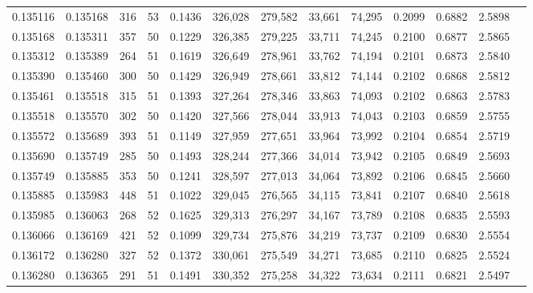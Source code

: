\begin{tabular}{rrrrrrrrrrrrr}
0.135116 & 0.135168 &   316 &  53 &                                     0.1436 & 326,028 & 279,582 &  33,661 &  74,295 & 0.2099 & 0.6882 & 2.5898 \\
0.135168 & 0.135311 &   357 &  50 &                                     0.1229 & 326,385 & 279,225 &  33,711 &  74,245 & 0.2100 & 0.6877 & 2.5865 \\
0.135312 & 0.135389 &   264 &  51 &                                     0.1619 & 326,649 & 278,961 &  33,762 &  74,194 & 0.2101 & 0.6873 & 2.5840 \\
0.135390 & 0.135460 &   300 &  50 &                                     0.1429 & 326,949 & 278,661 &  33,812 &  74,144 & 0.2102 & 0.6868 & 2.5812 \\
0.135461 & 0.135518 &   315 &  51 &                                     0.1393 & 327,264 & 278,346 &  33,863 &  74,093 & 0.2102 & 0.6863 & 2.5783 \\
0.135518 & 0.135570 &   302 &  50 &                                     0.1420 & 327,566 & 278,044 &  33,913 &  74,043 & 0.2103 & 0.6859 & 2.5755 \\
0.135572 & 0.135689 &   393 &  51 &                                     0.1149 & 327,959 & 277,651 &  33,964 &  73,992 & 0.2104 & 0.6854 & 2.5719 \\
0.135690 & 0.135749 &   285 &  50 &                                     0.1493 & 328,244 & 277,366 &  34,014 &  73,942 & 0.2105 & 0.6849 & 2.5693 \\
0.135749 & 0.135885 &   353 &  50 &                                     0.1241 & 328,597 & 277,013 &  34,064 &  73,892 & 0.2106 & 0.6845 & 2.5660 \\
0.135885 & 0.135983 &   448 &  51 &                                     0.1022 & 329,045 & 276,565 &  34,115 &  73,841 & 0.2107 & 0.6840 & 2.5618 \\
0.135985 & 0.136063 &   268 &  52 &                                     0.1625 & 329,313 & 276,297 &  34,167 &  73,789 & 0.2108 & 0.6835 & 2.5593 \\
0.136066 & 0.136169 &   421 &  52 &                                     0.1099 & 329,734 & 275,876 &  34,219 &  73,737 & 0.2109 & 0.6830 & 2.5554 \\
0.136172 & 0.136280 &   327 &  52 &                                     0.1372 & 330,061 & 275,549 &  34,271 &  73,685 & 0.2110 & 0.6825 & 2.5524 \\
0.136280 & 0.136365 &   291 &  51 &                                     0.1491 & 330,352 & 275,258 &  34,322 &  73,634 & 0.2111 & 0.6821 & 2.5497 \\

\end{tabular}
